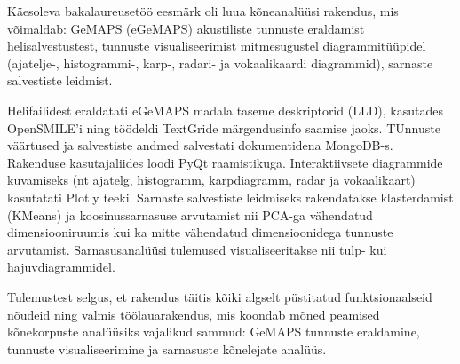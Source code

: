 Käesoleva bakalaureusetöö eesmärk oli luua kõneanalüüsi rakendus, mis võimaldab:
GeMAPS (eGeMAPS) akustiliste tunnuste eraldamist helisalvestustest,
tunnuste visualiseerimist mitmesugustel diagrammitüüpidel (ajatelje-, histogrammi-, karp-, radari- ja vokaalikaardi diagrammid),
sarnaste salvestiste leidmist.

Helifailidest eraldatati eGeMAPS madala taseme deskriptorid (LLD), kasutades OpenSMILE’i ning töödeldi TextGride märgendusinfo saamise jaoks. TUnnuste väärtused ja salvestiste andmed salvestati dokumentidena MongoDB-s.
Rakenduse kasutajaliides loodi PyQt raamistikuga. Interaktiivsete diagrammide kuvamiseks (nt ajatelg, histogramm, karpdiagramm, radar ja vokaalikaart) kasutatati Plotly teeki.
Sarnaste salvestiste leidmiseks rakendatakse klasterdamist (KMeans) ja koosinussarnasuse arvutamist nii PCA-ga vähendatud dimensiooniruumis kui ka mitte vähendatud dimensioonidega tunnuste arvutamist. Sarnasusanalüüsi tulemused visualiseeritakse nii tulp- kui hajuvdiagrammidel.

Tulemustest selgus, et rakendus täitis kõiki algselt püstitatud funktsionaalseid nõudeid ning valmis töölauarakendus, mis koondab mõned peamised kõnekorpuste analüüsiks vajalikud sammud: GeMAPS tunnuste eraldamine, tunnuste visualiseerimine ja sarnasuste kõnelejate analüüs.
